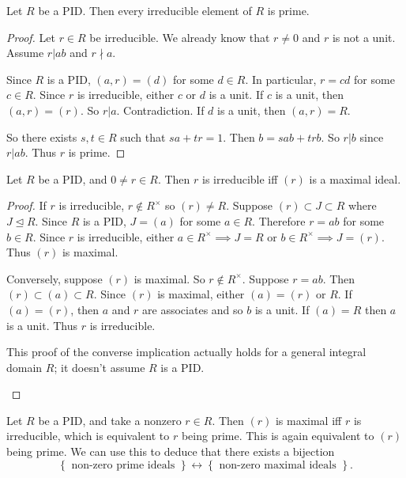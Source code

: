 \documentclass[egregdoesnotlikesansseriftitles,a4paper]{scrartcl}
\begin{document}
\begin{proposition}
       Let $R$ be a PID. Then every irreducible element of $R$ is prime.
\end{proposition}
\begin{proof}
       Let $r \in R$ be irreducible. We already know that $r \neq 0$ and $r$ is not a unit. Assume $r| ab $ and $r \nmid a$. 
       
       Since $R$ is a PID, $(a,r)=(d)$ for some $d \in R$. In particular, $r=cd $ for some $c \in R$. Since $r$ is irreducible, either $c$ or $d$ is a unit. If $c$ is a unit, then $(a,r)=(r)$. So $r|a$. Contradiction. If $d$ is a unit, then $(a,r)=R$.

       So there exists $s,t \in R$ such that $sa+tr=1$. Then $b=sab +trb$. So $r|b$ since $r|ab $. Thus $r$ is prime. 
\end{proof}
\begin{lemma}\label{pidmaximal}
      Let $R$ be a PID, and $0 \neq r \in R$. Then $r$ is irreducible iff $(r)$ is a maximal ideal. 
\end{lemma}
\begin{proof}
       If $r$ is irreducible, $r \notin R^{\times}$ so $(r)\neq R$. Suppose $(r) \subset J \subset  R$ where $J \unlhd R$. Since $R$ is a PID, $J=(a)$ for some $a \in R$. Therefore $r=ab$ for some $b \in R$. Since $r$ is irreducible, either $a \in R^{\times } \implies J=R$ or $b \in R^{\times } \implies J= (r)$. Thus $(r)$ is maximal. 

       Conversely, suppose $(r )$ is maximal. So $r \notin R^{\times }$. Suppose $r=ab $. Then $(r ) \subset (a ) \subset R$. Since $(r )$ is maximal, either $(a )=(r )$ or $R $. If $(a )=(r)$, then $a$ and $r$ are associates and so $b$ is a unit. If $(a)=R$ then $a$ is a unit. Thus $r$ is irreducible.
       \begin{remark}
              This proof of the converse implication actually holds for a general integral domain $R $; it doesn't assume $R$ is a PID.
       \end{remark}
\end{proof}
\begin{remark}
      Let $R$ be a PID, and take a nonzero $r \in R$. Then $(r)$ is maximal iff $r$ is irreducible, which is equivalent to $r$ being prime. This is again equivalent to $(r)$ being prime. We can use this to deduce that there exists a bijection \[
      \left\{\text{ non-zero prime ideals } \right\}\leftrightarrow \left\{\text{ non-zero maximal ideals } \right\}
      .\]
\end{remark}
\end{document}
